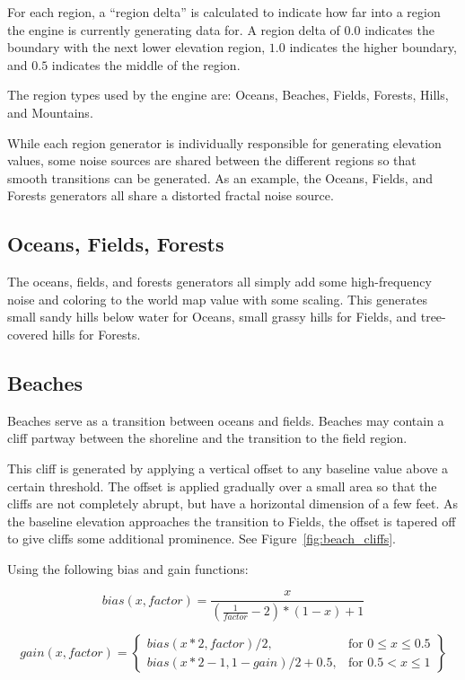 For each region, a ``region delta'' is calculated to indicate how far into a region the engine is currently generating data for.
A region delta of \(0.0\) indicates the boundary with the next lower elevation region, \(1.0\) indicates the higher boundary, and \(0.5\) indicates the middle of the region.

The region types used by the engine are: Oceans, Beaches, Fields, Forests, Hills, and Mountains.

While each region generator is individually responsible for generating elevation values, some noise sources are shared between the different regions so that smooth transitions can be generated.
As an example, the Oceans, Fields, and Forests generators all share a distorted fractal noise source.

\subsection{Oceans, Fields, Forests}

The oceans, fields, and forests generators all simply add some high-frequency noise and coloring to the world map value with some scaling.
This generates small sandy hills below water for Oceans, small grassy hills for Fields, and tree-covered hills for Forests.

\subsection{Beaches}

Beaches serve as a transition between oceans and fields.
Beaches may contain a cliff partway between the shoreline and the transition to the field region.

This cliff is generated by applying a vertical offset to any baseline value above a certain threshold.
The offset is applied gradually over a small area so that the cliffs are not completely abrupt, but have a horizontal dimension of a few feet.
As the baseline elevation approaches the transition to Fields, the offset is tapered off to give cliffs some additional prominence.
See Figure~\ref{fig:beach_cliffs}.

Using the following bias and gain functions:

$$
bias(x, factor) = \frac{x}{(\frac{1}{factor} - 2)*(1 - x) + 1}
$$

$$
gain(x, factor) = \left\{\begin{array}{lr}
	bias(x * 2, factor) / 2, & \text{for } 0 \leq x \leq 0.5 \\
	bias(x * 2 - 1, 1 - gain) / 2 + 0.5, & \text{for } 0.5 < x \leq 1
\end{array}\right\}
$$

